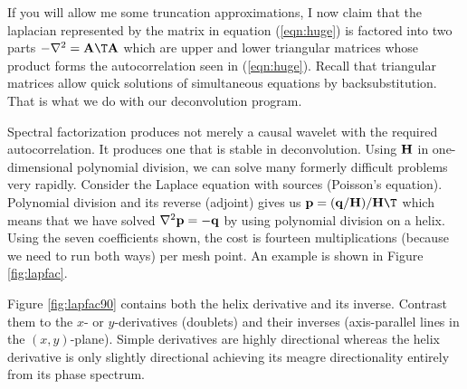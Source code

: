If you will allow me some truncation approximations,
I now claim that the laplacian represented by the
matrix in equation (\ref{eqn:huge})
is factored into two parts
$-\nabla^2 =\bold A\T\bold A$
which are upper and lower triangular matrices
whose product forms the autocorrelation seen in (\ref{eqn:huge}).
Recall that triangular matrices
allow quick solutions of simultaneous equations by backsubstitution.
That is what we do with our
deconvolution program.
\par
Spectral factorization produces not merely a causal wavelet
with the required autocorrelation.
It produces one that is stable in deconvolution.
Using $\bold H$ in one-dimensional polynomial division,
we can solve many formerly difficult problems very rapidly.
Consider the Laplace equation with sources (Poisson's equation).
Polynomial division and its reverse (adjoint) gives us
$\bold p =(\bold q/\bold H)/\bold H\T$
which means that we have solved
$\nabla^2 \bold p = -\bold q$
by using polynomial division on a helix.
Using the seven coefficients shown,
the cost is fourteen multiplications
(because we need to run both ways) per mesh point.
An example is shown in Figure \ref{fig:lapfac}.
\par
Figure \ref{fig:lapfac90} contains both the helix derivative and its inverse.
Contrast them to the $x$- or $y$-derivatives (doublets) and their inverses
(axis-parallel lines in the $(x,y)$-plane).
Simple derivatives are highly directional
whereas the helix derivative is only slightly directional
achieving its meagre directionality entirely from its phase spectrum.
